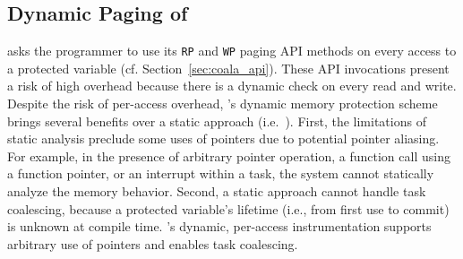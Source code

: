 \subsection{Dynamic Paging of \sys}
%
\sys asks the programmer to use its {\tt RP} and {\tt WP} paging API methods on
every access to a protected variable (cf. Section~\ref{sec:coala_api}).  These
API invocations present a risk of high overhead because there is a dynamic
check on every read and write. 
%
Despite the risk of per-access overhead, \sys's dynamic memory protection
scheme brings several benefits over a static approach (i.e.~\cite{alpaca}).  
First, the limitations of static analysis preclude some uses of pointers due to potential pointer
aliasing. For example, in the presence of arbitrary pointer operation, a
function call using a function pointer, or an interrupt within a task, the
system cannot statically analyze the memory behavior.   Second, a static approach
cannot handle task coalescing, because a protected variable's lifetime (i.e.,
from first use to commit) is unknown at compile time. \sys's dynamic,
per-access instrumentation supports arbitrary use of pointers and enables task
coalescing.